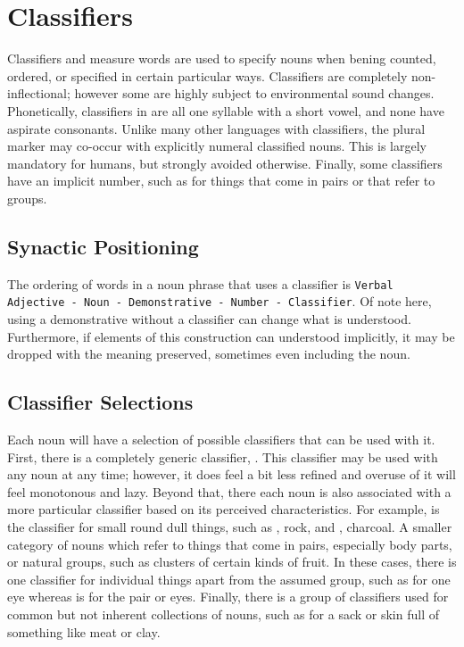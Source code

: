 \section{Classifiers}
Classifiers and measure words are used to specify nouns when bening counted, ordered, or specified in certain particular ways. Classifiers are completely non-inflectional; however some are highly subject to environmental sound changes. Phonetically, classifiers in \langname\space are all one syllable with a short vowel, and none have aspirate consonants. Unlike many other languages with classifiers, the plural marker may co-occur with explicitly numeral classified nouns. This is largely mandatory for humans, but strongly avoided otherwise. Finally, some classifiers have an implicit number, such as for things that come in pairs or that refer to groups.

\subsection{Synactic Positioning} 
The ordering of words in a noun phrase that uses a classifier is \texttt{Verbal Adjective - Noun - Demonstrative - Number - Classifier}. Of note here, using a demonstrative without a classifier can change what is understood. Furthermore, if elements of this construction can understood implicitly, it may be dropped with the meaning preserved, sometimes even including the noun. 

\subsection{Classifier Selections}
Each noun will have a selection of possible classifiers that can be used with it. First, there is a completely generic classifier, \langsample{\clfgen}. This classifier may be used with any noun at any time; however, it does feel a bit less refined and overuse of it will feel monotonous and lazy. Beyond that, there each noun is also associated with a more particular classifier based on its perceived characteristics. For example, \langsample{\clfrounddull} is the classifier for small round dull things, such as , rock, and , charcoal. A smaller category of nouns which refer to things that come in pairs, especially body parts, or natural groups, such as clusters of certain kinds of fruit. In these cases, there is one classifier for individual things apart from the assumed group, such as \langsample{\clfbodysing} for one eye whereas \langsample{\clfbodyjoin} is for the pair or eyes. Finally, there is a group of classifiers used for common but not inherent collections of nouns, such as \langsample{\clfsack} for a sack or skin full of something like meat or clay.


